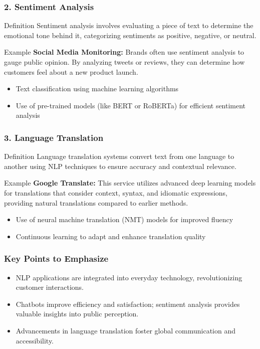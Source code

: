 \documentclass[aspectratio=169]{beamer}
\begin{document}
\begin{frame}[fragile]
    \frametitle{2. Sentiment Analysis}
    \begin{block}{Definition}
        Sentiment analysis involves evaluating a piece of text to determine the emotional tone behind it, categorizing sentiments as positive, negative, or neutral.
    \end{block}
    \begin{block}{Example}
        \textbf{Social Media Monitoring:} Brands often use sentiment analysis to gauge public opinion. By analyzing tweets or reviews, they can determine how customers feel about a new product launch.
    \end{block}
    
    \begin{itemize}
        \item Text classification using machine learning algorithms
        \item Use of pre-trained models (like BERT or RoBERTa) for efficient sentiment analysis
    \end{itemize}
\end{frame}

\begin{frame}[fragile]
    \frametitle{3. Language Translation}
    \begin{block}{Definition}
        Language translation systems convert text from one language to another using NLP techniques to ensure accuracy and contextual relevance.
    \end{block}
    \begin{block}{Example}
        \textbf{Google Translate:} This service utilizes advanced deep learning models for translations that consider context, syntax, and idiomatic expressions, providing natural translations compared to earlier methods.
    \end{block}

    \begin{itemize}
        \item Use of neural machine translation (NMT) models for improved fluency
        \item Continuous learning to adapt and enhance translation quality
    \end{itemize}
\end{frame}

\begin{frame}[fragile]
    \frametitle{Key Points to Emphasize}
    \begin{itemize}
        \item NLP applications are integrated into everyday technology, revolutionizing customer interactions.
        \item Chatbots improve efficiency and satisfaction; sentiment analysis provides valuable insights into public perception.
        \item Advancements in language translation foster global communication and accessibility.
    \end{itemize}
\end{frame}
\end{document}
